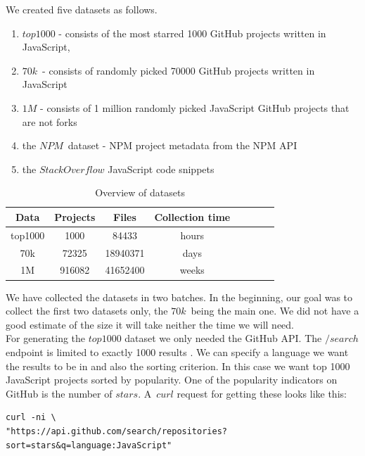 \documentclass[thesis=M,english]{FITthesis}[2012/10/20]
\begin{document}
We created five datasets as follows.

\begin{enumerate}
\item $top1000$ - consists of the most starred 1000 GitHub projects written in JavaScript,
\item $70k$ - consists of randomly picked 70000 GitHub projects written in JavaScript
\item $1M$ - consists of 1 million randomly picked JavaScript GitHub projects that are not forks
\item the $NPM$ dataset - NPM project metadata from the NPM API
\item the $StackOverflow$ JavaScript code snippets
\end{enumerate}

\begin{table}[]
\centering
\begin{tabular}{@{}cccccccc@{}}
\toprule

Data & Projects & Files & Collection time & \\ \midrule
top1000  & 1000  & 84433 & hours  & \\
70k  & 72325  & 18940371  & days &  \\
1M  & 916082 & 41652400 & weeks & \\
\bottomrule
\end{tabular}
\caption{Overview of datasets}
\label{gh_meta_popularity}
\end{table}

We have collected the datasets in two batches. In the beginning, our goal was to collect the first two datasets only, the $70k$ being the main one. We did not have a good estimate of the size it will take neither the time we will need. \\

For generating the $top1000$ dataset we only needed the GitHub API. The $/search$ endpoint is limited to exactly 1000 results \cite{gh_search}. We can specify a language we want the results to be in and also the sorting criterion. In this case we want top 1000 JavaScript projects sorted by popularity. One of the popularity indicators on GitHub is the number of $stars$. A~$curl$ request for getting these looks like this: \\

\lstset{title=Curl request for top1000 project from GitHub API}
\begin{lstlisting}[basicstyle=\tiny]
curl -ni \
"https://api.github.com/search/repositories?sort=stars&q=language:JavaScript"
\end{lstlisting}
\end{document}
